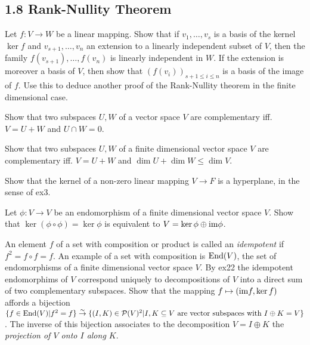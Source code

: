 \subsection*{1.8 Rank-Nullity Theorem}
\item Let $f : V \to W$ be a linear mapping. Show that if $v_{1}, \dots, v_{s}$ is a basis of the kernel $\ker f$ and $v_{s+1}, \dots, v_{n}$ an extension to a linearly independent subset of $V$, then the family $f(v_{s+1}), \dots, f(v_{n})$ is linearly independent in $W$. If the extension is moreover a basis of $V$, then show that $(f(v_{i}))_{s+1 \le i \le n}$ is a basis of the image of $f$. Use this to deduce another proof of the Rank-Nullity theorem in the finite dimensional case.
\item Show that two subspaces $U,W$ of a vector space $V$ are complementary iff. $V = U + W$ and $U \cap W = 0$.
\item Show that two subspaces $U,W$ of a finite dimensional vector space $V$ are complementary iff. $V = U + W$ and $\dim U + \dim W \le \dim V$.
\item Show that the kernel of a non-zero linear mapping $V \to F$ is a hyperplane, in the sense of ex3.
\item Let $\phi : V \to V$ be an endomorphism of a finite dimensional vector space $V$. Show that $\ker(\phi \circ \phi) = \ker \phi$ is equivalent to $V = \ker \phi \oplus \text{im} \phi$.
\item An element $f$ of a set with composition or product is called an \emph{idempotent} if $f^{2} = f \circ f = f$. An example of a set with composition is $\text{End}(V)$, the set of endomorphisms of a finite dimensional vector space $V$. By ex22 the idempotent endomorphims of $V$ correspond uniquely to decompositions of $V$ into a direct sum of two complementary subspaces. Show that the mapping $f \mapsto (\text{im} f, \ker f)$ affords a bijection $\{f \in \text{End}(V) | f^{2} = f\} \stackrel{\sim}{\to} \{(I, K) \in \mathcal{P}(V)^{2} | I, K \subseteq V \text{ are vector subspaces with } I \oplus K = V\}$. The inverse of this bijection associates to the decomposition $V = I \oplus K$ the \emph{projection of $V$ onto $I$ along $K$}.
